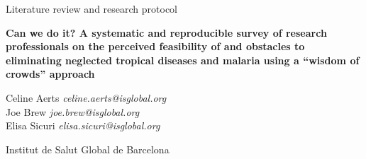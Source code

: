 \documentclass{article}
\begin{document}


\vspace{20mm}


\begin{Large}
\begin{center}
Literature review and research protocol
\end{center}
\end{Large}


\begin{large}
\begin{center}
\textbf{Can we do it? A systematic and reproducible survey of research professionals on the perceived feasibility of and obstacles to eliminating neglected tropical diseases and malaria using a “wisdom of crowds” approach} 
\end{center}
\end{large}


\vspace{5mm}

\begin{changemargin}{2.5cm}{2.5cm} 
\begin{center}
\begin{large}
Celine Aerts \hfill \emph{celine.aerts@isglobal.org } \\ 
Joe Brew \hfill \emph{joe.brew@isglobal.org} \\
Elisa Sicuri \hfill \emph{elisa.sicuri@isglobal.org} \\ 
\end{large}
\end{center}
\end{changemargin}


\vspace{6mm}

\begin{center}
\begin{large}
Institut de Salut Global de Barcelona 
\end{large}
\end{center}
\end{document}
